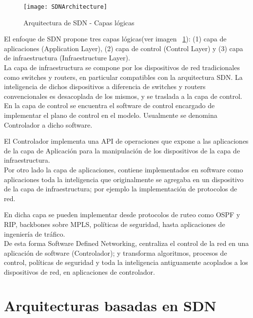 \begin{figure}[htbp!] 
\centering    
\texttt{[image: SDNArchitecture]}
\caption[Arquitectura de SDN - Capas lógicas]{Arquitectura de SDN - Capas lógicas}
\label{fig:SDNArchitecture}
\end{figure}

El enfoque de SDN propone tres capas lógicas(ver imagen ~\ref{fig:SDNArchitecture}): (1) capa de aplicaciones (Application Layer), (2) capa de control (Control Layer) y (3) capa de infraestructura (Infraestructure Layer).\\

La capa de infraestructura se compone por los dispositivos de red tradicionales como switches y routers, en particular compatibles con la arquitectura SDN. La inteligencia de dichos dispositivos a diferencia de switches y routers convencionales es desacoplada de los mismos, y se traslada a la capa de control.\\

En la capa de control se encuentra el software de control encargado de implementar el plano de control en el modelo. Usualmente se denomina Controlador a dicho software.

El Controlador implementa una API de operaciones que expone a las aplicaciones de la capa de Aplicación para la manipulación de los dispositivos de la capa de infraestructura.\\

Por otro lado la capa de aplicaciones, contiene implementados en software como aplicaciones toda la inteligencia que originalmente se agregaba en un dispositivo de la capa de infraestructura; por ejemplo la implementaci\'on de protocolos de red.

En dicha capa se pueden implementar desde protocolos de ruteo como OSPF y RIP, backbones sobre MPLS, políticas de seguridad, hasta aplicaciones de ingeniería de tráfico.\\

De esta forma Software Defined Networking, centraliza el control de la red en una aplicación de software (Controlador); y transforma algoritmos, procesos de control, políticas de seguridad y toda la inteligencia antiguamente acoplados a los dispositivos de red, en aplicaciones de controlador.\\

\section{Arquitecturas basadas en SDN}
\label{section2.3}

